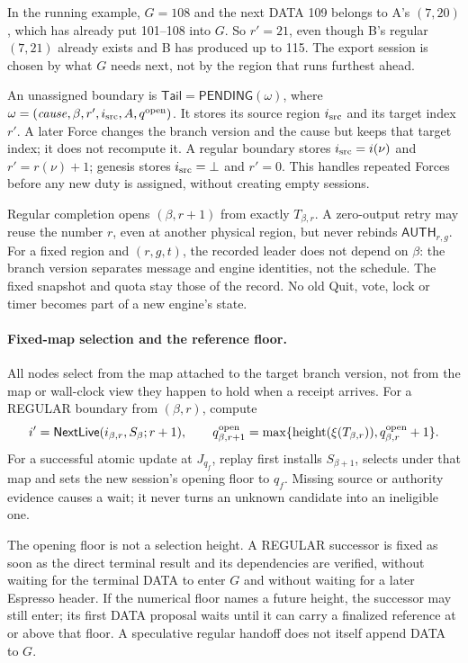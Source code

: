 \documentclass[11pt,a4paper]{article}
\newcommand{\tagg}[1]{\ensuremath{\mathsf{#1}}}
\begin{document}
In the running example, $G=108$ and the next DATA 109 belongs to A's
$(7,20)$, which has already put 101--108 into $G$. So $r'=21$, even though
B's regular $(7,21)$ already exists and B has produced up to 115. The
export session is chosen by what $G$ needs next, not by the region that
runs furthest ahead.

An unassigned boundary is
$\mathsf{Tail}=\tagg{PENDING}(\omega)$, where
$\omega=(\mathit{cause},\beta,r',i_{\rm src},A,q^{\rm open})$. It stores its source region $i_{\rm src}$ and its
target index $r'$. A later Force changes the branch version and the
cause but keeps that target index; it does not recompute it. A regular
boundary stores $i_{\rm src}=i(\nu)$ and $r'=r(\nu)+1$; genesis stores
$i_{\rm src}=\bot$ and $r'=0$. This handles repeated Forces
before any new duty is assigned, without creating empty sessions.

Regular completion opens $(\beta,r+1)$ from exactly $T_{\beta,r}$. A
zero-output retry may reuse the number $r$, even at another physical
region, but never rebinds $\tagg{AUTH}_{r,g}$. For a fixed region and
$(r,g,t)$, the recorded leader does not depend on $\beta$: the branch
version separates message and engine identities, not the schedule. The
fixed snapshot and quota stay those of the record. No old Quit, vote,
lock or timer becomes part of a new engine's state.


\paragraph{Fixed-map selection and the reference floor.}
All nodes select from the map attached to the target branch version, not
from the map or wall-clock view they happen to hold when a receipt
arrives. For a REGULAR boundary from $(\beta,r)$, compute
\[
 i'=\tagg{NextLive}(i_{\beta,r},S_\beta;r+1),\qquad
 q^{\rm open}_{\beta,r+1}
 =\max\{\operatorname{height}(\xi(T_{\beta,r})),
         q^{\rm open}_{\beta,r}+1\}.
\]
For a successful atomic update at $J_{q_f}$, replay first installs
$S_{\beta+1}$, selects under that map and sets the new session's opening
floor to $q_f$. Missing source or authority evidence causes a wait; it
never turns an unknown candidate into an ineligible one.

The opening floor is not a selection height. A REGULAR successor is
fixed as soon as the direct terminal result and its dependencies are
verified, without waiting for the terminal DATA to enter $G$ and without
waiting for a later Espresso header. If the numerical floor names a
future height, the successor may still enter; its first DATA proposal
waits until it can carry a finalized reference at or above that floor.
A speculative regular handoff does not itself append DATA to $G$.
\end{document}
